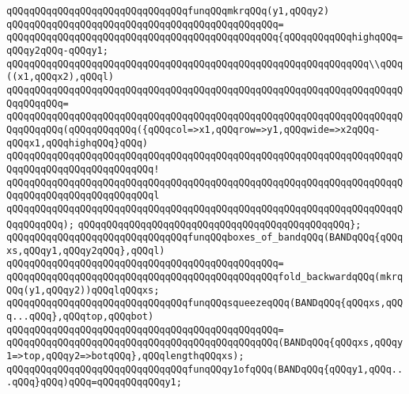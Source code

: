 \verb|qQQqqQQqqQQqqQQqqQQqqQQqqQQqqQQqfunqQQqmkrqQQq(y1,qQQqy2)|\newline
\verb|qQQqqQQqqQQqqQQqqQQqqQQqqQQqqQQqqQQqqQQqqQQqqQQq=|\newline
\verb|qQQqqQQqqQQqqQQqqQQqqQQqqQQqqQQqqQQqqQQqqQQqqQQq{qQQqqQQqqQQqhighqQQq=qQQqy2qQQq-qQQqy1;|\newline
\newline
\verb|qQQqqQQqqQQqqQQqqQQqqQQqqQQqqQQqqQQqqQQqqQQqqQQqqQQqqQQqqQQqqQQq\\qQQq((x1,qQQqx2),qQQql)|\newline
\verb|qQQqqQQqqQQqqQQqqQQqqQQqqQQqqQQqqQQqqQQqqQQqqQQqqQQqqQQqqQQqqQQqqQQqqQQqqQQqqQQq=|\newline
\verb|qQQqqQQqqQQqqQQqqQQqqQQqqQQqqQQqqQQqqQQqqQQqqQQqqQQqqQQqqQQqqQQqqQQqqQQqqQQqqQQq(qQQqqQQqqQQq({qQQqcol=>x1,qQQqrow=>y1,qQQqwide=>x2qQQq-qQQqx1,qQQqhighqQQq}qQQq)|\newline
\verb|qQQqqQQqqQQqqQQqqQQqqQQqqQQqqQQqqQQqqQQqqQQqqQQqqQQqqQQqqQQqqQQqqQQqqQQqqQQqqQQqqQQqqQQqqQQqqQQq!|\newline
\verb|qQQqqQQqqQQqqQQqqQQqqQQqqQQqqQQqqQQqqQQqqQQqqQQqqQQqqQQqqQQqqQQqqQQqqQQqqQQqqQQqqQQqqQQqqQQqqQQql|\newline
\verb|qQQqqQQqqQQqqQQqqQQqqQQqqQQqqQQqqQQqqQQqqQQqqQQqqQQqqQQqqQQqqQQqqQQqqQQqqQQqqQQq);|\newline
\verb|qQQqqQQqqQQqqQQqqQQqqQQqqQQqqQQqqQQqqQQqqQQqqQQq};|\newline
\newline
\verb|qQQqqQQqqQQqqQQqqQQqqQQqqQQqqQQqfunqQQqboxes_of_bandqQQq(BANDqQQq{qQQqxs,qQQqy1,qQQqy2qQQq},qQQql)|\newline
\verb|qQQqqQQqqQQqqQQqqQQqqQQqqQQqqQQqqQQqqQQqqQQqqQQq=|\newline
\verb|qQQqqQQqqQQqqQQqqQQqqQQqqQQqqQQqqQQqqQQqqQQqqQQqfold_backwardqQQq(mkrqQQq(y1,qQQqy2))qQQqlqQQqxs;|\newline
\newline
\verb|qQQqqQQqqQQqqQQqqQQqqQQqqQQqqQQqfunqQQqsqueezeqQQq(BANDqQQq{qQQqxs,qQQq...qQQq},qQQqtop,qQQqbot)|\newline
\verb|qQQqqQQqqQQqqQQqqQQqqQQqqQQqqQQqqQQqqQQqqQQqqQQq=|\newline
\verb|qQQqqQQqqQQqqQQqqQQqqQQqqQQqqQQqqQQqqQQqqQQqqQQq(BANDqQQq{qQQqxs,qQQqy1=>top,qQQqy2=>botqQQq},qQQqlengthqQQqxs);|\newline
\newline
\verb|qQQqqQQqqQQqqQQqqQQqqQQqqQQqqQQqfunqQQqy1ofqQQq(BANDqQQq{qQQqy1,qQQq...qQQq}qQQq)qQQq=qQQqqQQqqQQqy1;|\newline
